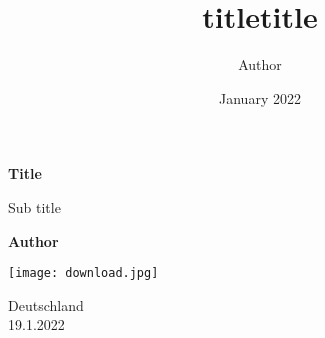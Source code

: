 \documentclass{article}
\title{title}
\author{Author}
\date{January 2022}
\begin{document}
\begin{titlepage}
   \begin{center}
       \vspace*{1cm}

       \textbf{Title}

       \vspace{0.5cm}
        Sub title
            
       \vspace{1.5cm}

       \textbf{Author}

       \vfill
       
      \texttt{[image: download.jpg]}

            
       \vspace{0.8cm}
     
       Deutschland\\
       19.1.2022
            
   \end{center}
\end{titlepage}

\maketitle
\tableofcontents
\title{title}

\makeindex
\newpage
\end{document}
